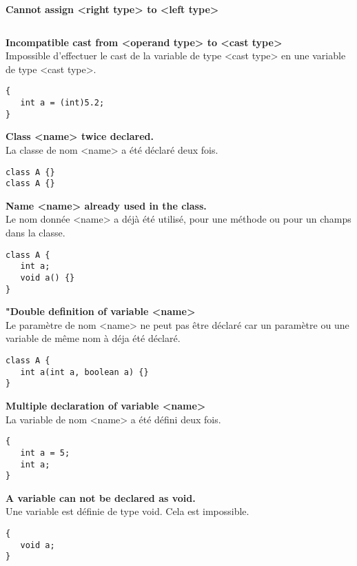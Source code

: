 \documentclass[a4,12pt]{article}
\begin{document}
\textbf{Cannot assign <right type> to <left type>}\\

\begin{lstlisting}

\end{lstlisting}



\textbf{Incompatible cast from <operand type> to <cast type>}\\
Impossible d'effectuer le cast de la variable de type <cast type> en une variable de type <cast type>.
\begin{lstlisting}
{
   int a = (int)5.2;
}
\end{lstlisting}



\textbf{Class <name> twice declared.}\\
La classe de nom <name> a été déclaré deux fois.
\begin{lstlisting}
class A {}
class A {}
\end{lstlisting}



\textbf{Name <name> already used in the class.}\\
Le nom donnée <name> a déjà été utilisé, pour une méthode ou pour un champs dans la classe.
\begin{lstlisting}
class A {
   int a;
   void a() {}
}
\end{lstlisting}



\textbf{"Double definition of variable <name>}\\
Le paramètre de nom <name> ne peut pas être déclaré car un paramètre ou une variable de même nom à déja été déclaré.
\begin{lstlisting}
class A {
   int a(int a, boolean a) {}
}
\end{lstlisting}



\textbf{Multiple declaration of variable <name>}\\
La variable de nom <name> a été défini deux fois.
\begin{lstlisting}
{
   int a = 5;
   int a;
}
\end{lstlisting}



\textbf{A variable can not be declared as void.}\\
Une variable est définie de type void. Cela est impossible.
\begin{lstlisting}
{
   void a;
}
\end{lstlisting}
\end{document}
